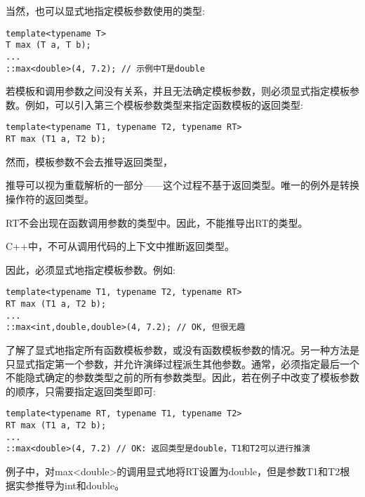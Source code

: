 当然，也可以显式地指定模板参数使用的类型:

\begin{lstlisting}[style=styleCXX]
template<typename T>
T max (T a, T b);
...
::max<double>(4, 7.2); // 示例中T是double
\end{lstlisting}

若模板和调用参数之间没有关系，并且无法确定模板参数，则必须显式指定模板参数。例如，可以引入第三个模板参数类型来指定函数模板的返回类型:

\begin{lstlisting}[style=styleCXX]
template<typename T1, typename T2, typename RT>
RT max (T1 a, T2 b);
\end{lstlisting}

然而，模板参数不会去推导返回类型，

\begin{tcolorbox}[colback=webgreen!5!white,colframe=webgreen!75!black]
\hspace*{0.75cm}推导可以视为重载解析的一部分——这个过程不基于返回类型。唯一的例外是转换操作符的返回类型。
\end{tcolorbox}

RT不会出现在函数调用参数的类型中。因此，不能推导出RT的类型。

\begin{tcolorbox}[colback=webgreen!5!white,colframe=webgreen!75!black]
\hspace*{0.75cm}C++中，不可从调用代码的上下文中推断返回类型。
\end{tcolorbox}

因此，必须显式地指定模板参数。例如:

\begin{lstlisting}[style=styleCXX]
template<typename T1, typename T2, typename RT>
RT max (T1 a, T2 b);
...
::max<int,double,double>(4, 7.2); // OK, 但很无趣
\end{lstlisting}

了解了显式地指定所有函数模板参数，或没有函数模板参数的情况。另一种方法是只显式指定第一个参数，并允许演绎过程派生其他参数。通常，必须指定最后一个不能隐式确定的参数类型之前的所有参数类型。因此，若在例子中改变了模板参数的顺序，只需要指定返回类型即可:

\begin{lstlisting}[style=styleCXX]
template<typename RT, typename T1, typename T2>
RT max (T1 a, T2 b);
...
::max<double>(4, 7.2) // OK: 返回类型是double，T1和T2可以进行推演
\end{lstlisting}

例子中，对max<double>的调用显式地将RT设置为double，但是参数T1和T2根据实参推导为int和double。

